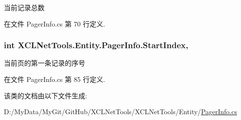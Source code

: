当前记录总数 



在文件 Pager\-Info.\-cs 第 70 行定义.

\hypertarget{class_x_c_l_net_tools_1_1_entity_1_1_pager_info_a659b36bf635a3fed41ee3b82ec4c2cbe}{
\subsubsection[{Start\-Index}]{\setlength{\rightskip}{0pt plus 5cm}int X\-C\-L\-Net\-Tools.\-Entity.\-Pager\-Info.\-Start\-Index\hspace{0.3cm}{\ttfamily [get]}, {\ttfamily [set]}}}\label{class_x_c_l_net_tools_1_1_entity_1_1_pager_info_a659b36bf635a3fed41ee3b82ec4c2cbe}


当前页的第一条记录的序号 



在文件 Pager\-Info.\-cs 第 85 行定义.



该类的文档由以下文件生成\-:\begin{DoxyCompactItemize}
\item 
D\-:/\-My\-Data/\-My\-Git/\-Git\-Hub/\-X\-C\-L\-Net\-Tools/\-X\-C\-L\-Net\-Tools/\-Entity/\hyperlink{_pager_info_8cs}{Pager\-Info.\-cs}\end{DoxyCompactItemize}
